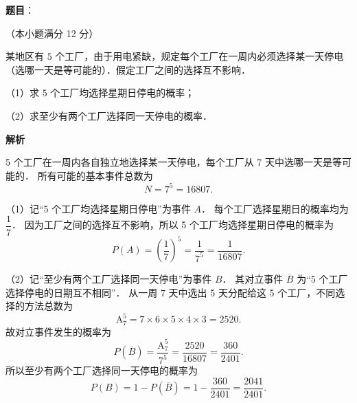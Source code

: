 \begin{answer}

\textbf{题目}：

（本小题满分 12 分）

某地区有 $5$ 个工厂，由于用电紧缺，规定每个工厂在一周内必须选择某一天停电（选哪一天是等可能的）．假定工厂之间的选择互不影响．

（1）求 $5$ 个工厂均选择星期日停电的概率；

（2）求至少有两个工厂选择同一天停电的概率．

\textbf{解析}

5 个工厂在一周内各自独立地选择某一天停电，每个工厂从 7 天中选哪一天是等可能的．
所有可能的基本事件总数为
\nopagebreak[4]
\[
N = 7^5 = 16807.
\]

（1）记“5 个工厂均选择星期日停电”为事件 $A$．
每个工厂选择星期日的概率均为 $\dfrac{1}{7}$．
因为工厂之间的选择互不影响，所以 5 个工厂均选择星期日停电的概率为
\nopagebreak[4]
\[
P(A) = \left(\frac{1}{7}\right)^5 = \frac{1}{7^5} = \frac{1}{16807}.
\]

（2）记“至少有两个工厂选择同一天停电”为事件 $B$．
其对立事件 $\overline{B}$ 为“5 个工厂选择停电的日期互不相同”．
从一周 7 天中选出 5 天分配给这 5 个工厂，不同选择的方法总数为
\nopagebreak[4]
\[
\mathrm{A}_7^5 = 7 \times 6 \times 5 \times 4 \times 3 = 2520.
\]
故对立事件发生的概率为
\nopagebreak[4]
\[
P(\overline{B}) = \frac{\mathrm{A}_7^5}{7^5} = \frac{2520}{16807} = \frac{360}{2401}.
\]
所以至少有两个工厂选择同一天停电的概率为
\nopagebreak[4]
\[
P(B) = 1 - P(\overline{B}) = 1 - \frac{360}{2401} = \frac{2041}{2401}.
\]


\end{answer}
